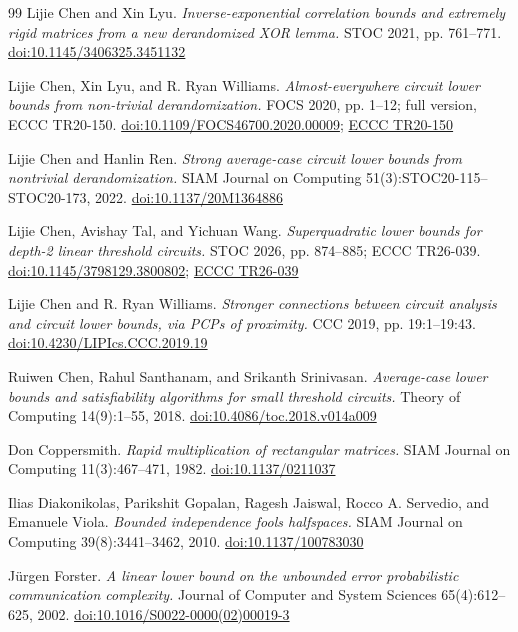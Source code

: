 \documentclass[11pt,letterpaper]{article}
\theoremstyle{definition}
\theoremstyle{remark}
\begin{document}
\begin{thebibliography}{99}
 Lijie Chen and Xin Lyu. \emph{Inverse-exponential
correlation bounds and extremely rigid matrices from a new derandomized
XOR lemma.} STOC 2021, pp. 761--771.
\href{https://doi.org/10.1145/3406325.3451132}{doi:10.1145/3406325.3451132}

 Lijie Chen, Xin Lyu, and R. Ryan Williams.
\emph{Almost-everywhere circuit lower bounds from non-trivial
derandomization.} FOCS 2020, pp. 1--12; full version, ECCC TR20-150.
\href{https://doi.org/10.1109/FOCS46700.2020.00009}{doi:10.1109/FOCS46700.2020.00009};
\href{https://eccc.weizmann.ac.il/report/2020/150/}{ECCC TR20-150}

 Lijie Chen and Hanlin Ren. \emph{Strong average-case circuit
lower bounds from nontrivial derandomization.} SIAM Journal on Computing
51(3):STOC20-115--STOC20-173, 2022.
\href{https://doi.org/10.1137/20M1364886}{doi:10.1137/20M1364886}

 Lijie Chen, Avishay Tal, and Yichuan Wang.
\emph{Superquadratic lower bounds for depth-2 linear threshold
circuits.} STOC 2026, pp. 874--885; ECCC TR26-039.
\href{https://doi.org/10.1145/3798129.3800802}{doi:10.1145/3798129.3800802};
\href{https://eccc.weizmann.ac.il/report/2026/039/}{ECCC TR26-039}

 Lijie Chen and R. Ryan Williams. \emph{Stronger connections
between circuit analysis and circuit lower bounds, via PCPs of
proximity.} CCC 2019, pp. 19:1--19:43.
\href{https://doi.org/10.4230/LIPIcs.CCC.2019.19}{doi:10.4230/LIPIcs.CCC.2019.19}

 Ruiwen Chen, Rahul Santhanam, and Srikanth Srinivasan.
\emph{Average-case lower bounds and satisfiability algorithms for small
threshold circuits.} Theory of Computing 14(9):1--55, 2018.
\href{https://doi.org/10.4086/toc.2018.v014a009}{doi:10.4086/toc.2018.v014a009}

 Don Coppersmith. \emph{Rapid multiplication of rectangular
matrices.} SIAM Journal on Computing 11(3):467--471, 1982.
\href{https://doi.org/10.1137/0211037}{doi:10.1137/0211037}

 Ilias Diakonikolas, Parikshit Gopalan, Ragesh Jaiswal, Rocco
A. Servedio, and Emanuele Viola. \emph{Bounded independence fools
halfspaces.} SIAM Journal on Computing 39(8):3441--3462, 2010.
\href{https://doi.org/10.1137/100783030}{doi:10.1137/100783030}

 J{\"u}rgen Forster. \emph{A linear lower bound on the
unbounded error probabilistic communication complexity.} Journal of
Computer and System Sciences 65(4):612--625, 2002.
\href{https://doi.org/10.1016/S0022-0000(02)00019-3}{doi:10.1016/S0022-0000(02)00019-3}


\end{thebibliography}
\end{document}
